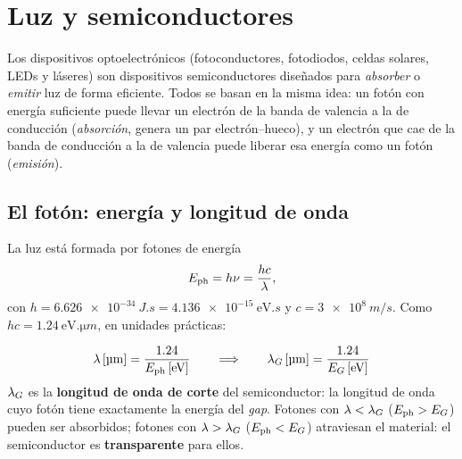 \section{Luz y semiconductores}

Los dispositivos optoelectrónicos (fotoconductores, fotodiodos, celdas solares, LEDs y
láseres) son dispositivos semiconductores diseñados para \emph{absorber} o \emph{emitir}
luz de forma eficiente. Todos se basan en la misma idea: un fotón con energía suficiente
puede llevar un electrón de la banda de valencia a la de conducción (\emph{absorción},
genera un par electrón--hueco), y un electrón que cae de la banda de conducción a la de
valencia puede liberar esa energía como un fotón (\emph{emisión}).

\subsection{El fotón: energía y longitud de onda}

La luz está formada por fotones de energía
\begin{equation}
  E_{\mathrm{ph}} = h\nu = \frac{hc}{\lambda},
\end{equation}
con $h=\SI{6.626e-34}{J.s}=\SI{4.136e-15}{\eV.s}$ y $c=\SI{3e8}{m/s}$. Como
$hc = \SI{1.24}{\eV.\micro m}$, en unidades prácticas:

\begin{clave}
\[
  \lambda\,[\si{\micro m}] = \frac{1.24}{\Eph\,[\si{\eV}]}
  \qquad\Longrightarrow\qquad
  \lG\,[\si{\micro m}] = \frac{1.24}{\EG\,[\si{\eV}]}
\]
$\lambda_G$ es la \textbf{longitud de onda de corte} del semiconductor: la longitud de onda
cuyo fotón tiene exactamente la energía del \emph{gap}. Fotones con $\lambda<\lambda_G$
($E_{\mathrm{ph}}>E_G$) pueden ser absorbidos; fotones con $\lambda>\lambda_G$ ($E_{\mathrm{ph}}<E_G$) atraviesan el
material: el semiconductor es \textbf{transparente} para ellos.
\end{clave}

